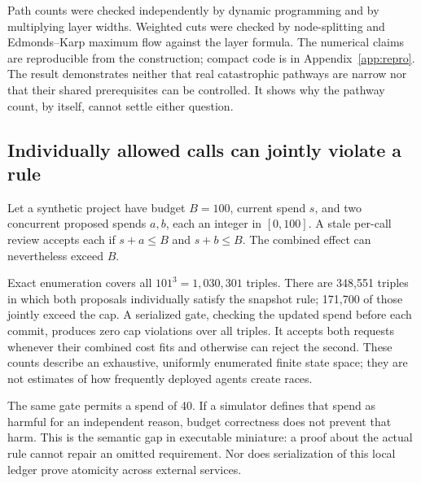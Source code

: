 \documentclass[10pt,twocolumn,letterpaper]{article}
\begin{document}
Path counts were checked independently by dynamic programming and by multiplying layer widths. Weighted cuts were checked by node-splitting and Edmonds--Karp maximum flow against the layer formula. The numerical claims are reproducible from the construction; compact code is in Appendix~\ref{app:repro}. The result demonstrates neither that real catastrophic pathways are narrow nor that their shared prerequisites can be controlled. It shows why the pathway count, by itself, cannot settle either question.

\subsection{Individually allowed calls can jointly violate a rule}
Let a synthetic project have budget $B=100$, current spend $s$, and two concurrent proposed spends $a,b$, each an integer in $[0,100]$. A stale per-call review accepts each if $s+a\leq B$ and $s+b\leq B$. The combined effect can nevertheless exceed $B$.

Exact enumeration covers all $101^3=1,030,301$ triples. There are 348,551 triples in which both proposals individually satisfy the snapshot rule; 171,700 of those jointly exceed the cap. A serialized gate, checking the updated spend before each commit, produces zero cap violations over all triples. It accepts both requests whenever their combined cost fits and otherwise can reject the second. These counts describe an exhaustive, uniformly enumerated finite state space; they are not estimates of how frequently deployed agents create races.

The same gate permits a spend of 40. If a simulator defines that spend as harmful for an independent reason, budget correctness does not prevent that harm. This is the semantic gap in executable miniature: a proof about the actual rule cannot repair an omitted requirement. Nor does serialization of this local ledger prove atomicity across external services.
\end{document}
